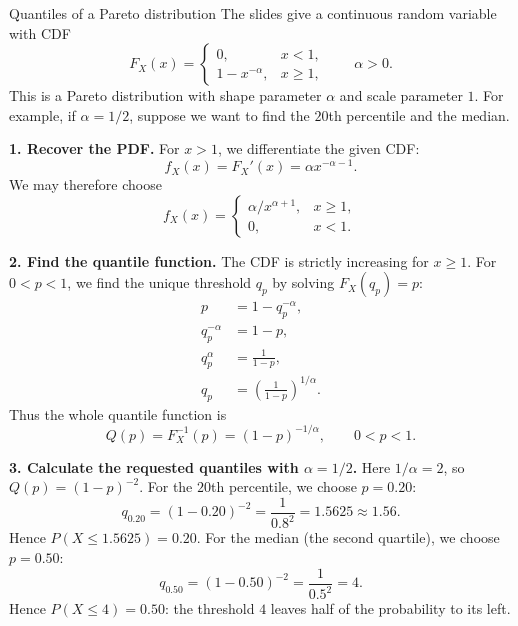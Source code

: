 \documentclass[a4paper,12pt,oneside]{report}
\begin{document}
\clearpage
\begin{framedexample}{Quantiles of a Pareto distribution}
\label{ex:pareto-quantiles}
The slides give a continuous random variable with CDF
\[
  F_X(x)=
  \begin{cases}
    0, & x<1,\\
    1-x^{-\alpha}, & x\geq1,
  \end{cases}
  \qquad \alpha>0.
\]
This is a Pareto distribution with shape parameter $\alpha$ and
scale parameter $1$. For example, if $\alpha=1/2$, suppose we want
to find the $20$th percentile and the median.

\textbf{1. Recover the PDF.}
For $x>1$, we differentiate the given CDF:
\[
  f_X(x)=F_X'(x)=\alpha x^{-\alpha-1}.
\]
We may therefore choose
\[
  f_X(x)=
  \begin{cases}
    \alpha/x^{\alpha+1}, & x\geq1,\\
    0, & x<1.
  \end{cases}
\]

\textbf{2. Find the quantile function.}
The CDF is strictly increasing for $x\geq1$. For $0<p<1$,
we find the unique threshold $q_p$ by solving $F_X(q_p)=p$:
\[
  \begin{aligned}
    p&=1-q_p^{-\alpha},\\
    q_p^{-\alpha}&=1-p,\\
    q_p^{\alpha}&=\frac{1}{1-p},\\
    q_p&=\left(\frac{1}{1-p}\right)^{1/\alpha}.
  \end{aligned}
\]
Thus the whole quantile function is
\[
  \boxed{Q(p)=F_X^{-1}(p)=(1-p)^{-1/\alpha},\qquad 0<p<1.}
\]

\textbf{3. Calculate the requested quantiles with $\alpha=1/2$.}
Here $1/\alpha=2$, so $Q(p)=(1-p)^{-2}$.
For the $20$th percentile, we choose $p=0.20$:
\[
  \boxed{q_{0.20}=(1-0.20)^{-2}
    =\frac{1}{0.8^2}=1.5625\approx1.56.}
\]
Hence $P(X\leq1.5625)=0.20$.
For the median (the second quartile), we choose $p=0.50$:
\[
  \boxed{q_{0.50}=(1-0.50)^{-2}
    =\frac{1}{0.5^2}=4.}
\]
Hence $P(X\leq4)=0.50$: the threshold $4$ leaves half of the
probability to its left.
\end{framedexample}
\end{document}
